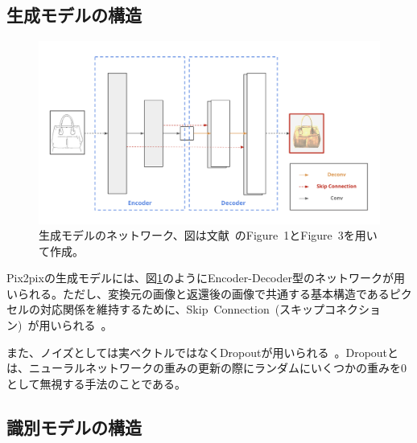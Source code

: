 \subsection{生成モデルの構造}

\begin{figure}[t]
\begin{center}
\includegraphics[width=0.95\hsize]{figure/u-net.png}
\caption{生成モデルのネットワーク、図は文献~\cite{pix2pix}のFigure~1とFigure~3を用いて作成。}
\label{fig:u-net}
\end{center}
\end{figure}

Pix2pixの生成モデルには、図\ref{fig:u-net}のようにEncoder-Decoder型のネットワークが用いられる。ただし、変換元の画像と返還後の画像で共通する基本構造であるピクセルの対応関係を維持するために、Skip~Connection~(スキップコネクション)~が用いられる~\cite{u-net}。


また、ノイズとしては実ベクトルではなくDropoutが用いられる~\cite{Dropout}。Dropoutとは、ニューラルネットワークの重みの更新の際にランダムにいくつかの重みを0として無視する手法のことである。

\subsection{識別モデルの構造}

